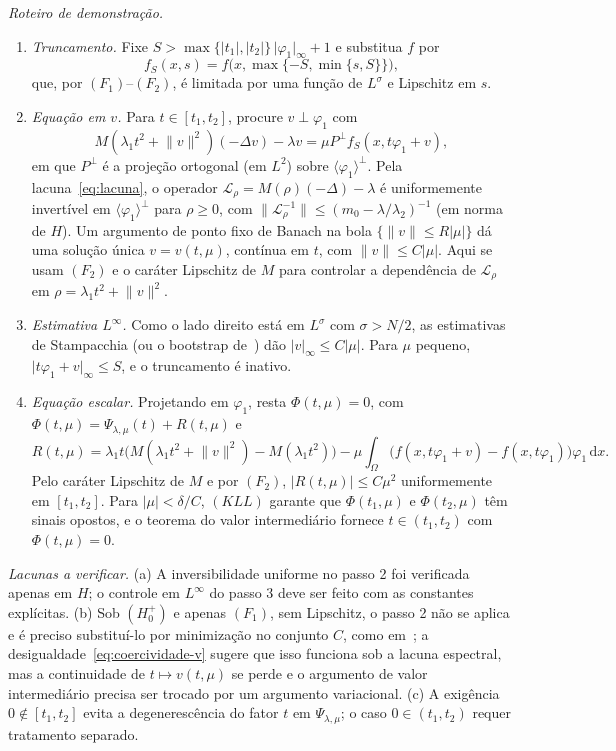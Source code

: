 \documentclass[11pt,a4paper]{article}
\theoremstyle{plain}
\theoremstyle{definition}
\theoremstyle{remark}
\newcommand{\norm}[1]{\lVert #1\rVert}
\newcommand{\abs}[1]{\lvert #1\rvert}
\newcommand{\dx}{\,\mathrm{d}x}
\begin{document}
\noindent\emph{Roteiro de demonstração.}
\begin{enumerate}[label=\arabic*.,nosep]
\item \emph{Truncamento.} Fixe $S>\max\{\abs{t_1},\abs{t_2}\}\,\abs{\varphi_1}_\infty+1$ e
substitua $f$ por
\[
f_S(x,s)=f\bigl(x,\max\{-S,\min\{s,S\}\}\bigr),
\]
que, por $(F_1)$--$(F_2)$, é limitada por uma função de $L^\sigma$ e
Lipschitz em $s$.
\item \emph{Equação em $v$.} Para $t\in[t_1,t_2]$, procure $v\perp\varphi_1$ com
\[
M(\lambda_1t^2+\norm{v}^2)(-\Delta v)-\lambda v=\mu P^\perp f_S(x,t\varphi_1+v),
\]
em que $P^\perp$ é a projeção ortogonal (em $L^2$) sobre
$\langle\varphi_1\rangle^\perp$. Pela lacuna~\eqref{eq:lacuna}, o operador
$\mathcal{L}_\rho=M(\rho)(-\Delta)-\lambda$ é uniformemente invertível em
$\langle\varphi_1\rangle^\perp$ para $\rho\ge0$, com
$\norm{\mathcal{L}_\rho^{-1}}\le(m_0-\lambda/\lambda_2)^{-1}$ (em norma de $H$). Um
argumento de ponto fixo de Banach na bola $\{\norm{v}\le R\abs{\mu}\}$ dá uma
solução única $v=v(t,\mu)$, contínua em $t$, com $\norm{v}\le C\abs{\mu}$. Aqui
se usam $(F_2)$ e o caráter Lipschitz de $M$ para controlar a dependência de
$\mathcal{L}_\rho$ em $\rho=\lambda_1t^2+\norm{v}^2$.
\item \emph{Estimativa $L^\infty$.} Como o lado direito está em $L^\sigma$ com
$\sigma>N/2$, as estimativas de Stampacchia (ou o bootstrap
de~\cite{RezendeSanchezSilva2019}) dão $\abs{v}_\infty\le C\abs{\mu}$. Para
$\mu$ pequeno, $\abs{t\varphi_1+v}_\infty\le S$, e o truncamento é inativo.
\item \emph{Equação escalar.} Projetando em $\varphi_1$, resta
$\Phi(t,\mu)=0$, com
$\Phi(t,\mu)=\Psi_{\lambda,\mu}(t)+R(t,\mu)$ e
\[
R(t,\mu)=\lambda_1t\bigl(M(\lambda_1t^2+\norm{v}^2)-M(\lambda_1t^2)\bigr)
-\mu\int_\Omega\bigl(f(x,t\varphi_1+v)-f(x,t\varphi_1)\bigr)\varphi_1\dx .
\]
Pelo caráter Lipschitz de $M$ e por $(F_2)$, $\abs{R(t,\mu)}\le C\mu^2$
uniformemente em $[t_1,t_2]$. Para $\abs{\mu}<\delta/C$, $(KLL)$ garante que
$\Phi(t_1,\mu)$ e $\Phi(t_2,\mu)$ têm sinais opostos, e o teorema do valor
intermediário fornece $t\in(t_1,t_2)$ com $\Phi(t,\mu)=0$.
\end{enumerate}

\noindent\emph{Lacunas a verificar.} (a) A inversibilidade uniforme no passo 2
foi verificada apenas em $H$; o controle em $L^\infty$ do passo 3 deve ser feito
com as constantes explícitas. (b) Sob $(H_0^+)$ e apenas $(F_1)$, sem
Lipschitz, o passo 2 não se aplica e é preciso substituí-lo por minimização no
conjunto $C$, como em~\cite{RezendeSanchezSilva2019}; a
desigualdade~\eqref{eq:coercividade-v} sugere que isso funciona sob a lacuna
espectral, mas a continuidade de $t\mapsto v(t,\mu)$ se perde e o argumento de
valor intermediário precisa ser trocado por um argumento variacional. (c) A
exigência $0\notin[t_1,t_2]$ evita a degenerescência do fator $t$ em
$\Psi_{\lambda,\mu}$; o caso $0\in(t_1,t_2)$ requer tratamento separado.
\end{document}
